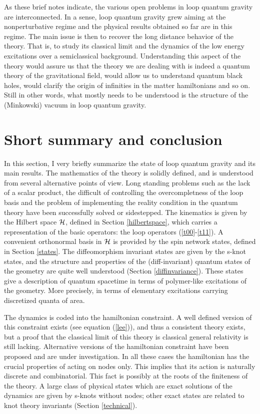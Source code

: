 As these brief notes indicate, the various open problems in loop 
quantum gravity are interconnected.  In a sense, loop quantum 
gravity grew aiming at the nonperturbative regime and the physical 
results obtained so far are in this regime.  The main issue is 
then to recover the long distance behavior of the theory.  That 
is, to study its classical limit and the dynamics of the low 
energy excitations over a semiclassical background.  Understanding 
this aspect of the theory would assure us that the theory we are 
dealing with is indeed a quantum theory of the gravitational 
field, would allow us to understand quantum black holes, would 
clarify the origin of infinities in the matter hamiltonians and so 
on.  Still in other words, what mostly needs to be understood is 
the structure of the (Minkowski) vacuum in loop quantum gravity.

\section{Short summary and conclusion}\label{8}

In this section, I very briefly summarize the state of loop quantum 
gravity and its main results.  The mathematics of the theory is 
solidly defined, and is understood from several alternative points of 
view.  Long standing problems such as the lack of a scalar product, 
the difficult of controlling the overcompletness of the loop basis and 
the problem of implementing the reality condition in the quantum 
theory have been successfully solved or sidestepped.  The kinematics is 
given by the Hilbert space $\cal H$, defined in Section 
\ref{hilbertspace}, which carries a representation of the basic 
operators: the loop operators (\ref{t00}-\ref{t11}).  A convenient 
orthonormal basis in $\cal H$ is provided by the spin network states, 
defined in Section \ref{states}.  The diffeomorphism invariant states 
are given by the s-knot states, and the structure and properties of 
the (diff-invariant) quantum states of the geometry are quite well 
understood (Section \ref{diffinvariance}).  These states give a 
description of quantum spacetime in terms of polymer-like excitations 
of the geometry.  More precisely, in terms of elementary excitations 
carrying discretized quanta of area.

The dynamics is coded into the hamiltonian constraint.  A well defined 
version of this constraint exists (see equation (\ref{lee})), and thus 
a consistent theory exists, but a proof that the classical limit of 
this theory is classical general relativity is still lacking.  Alternative 
versions of the hamiltonian constraint have been proposed and are 
under investigation.  In all these cases the hamiltonian has the 
crucial properties of acting on nodes only.  This implies that its 
action is naturally discrete and combinatorial.  This fact is possibly 
at the roots of the finiteness of the theory.  A large class of 
physical states which are exact solutions of the dynamics are given by 
s-knots without nodes; other exact states are related to knot theory 
invariants (Section \ref{technical}).

